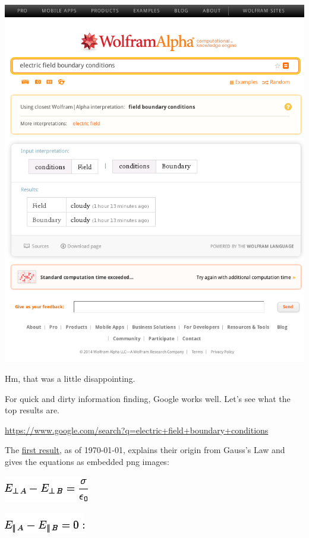 \documentclass[12pt,letterpaper]{article}
\begin{document}
\begin{center}
\includegraphics[scale=0.7]{figures/wolfram-alpha-electric-field-boundary-conditions.png}
\end{center}

Hm, that was a little disappointing.

For quick and dirty information finding,
Google works well.
Let's see what the top results are.

\url{https://www.google.com/search?q=electric+field+boundary+conditions}

The
\href{http://farside.ph.utexas.edu/teaching/em/lectures/node59.html}
{first result}, as of \today,
explains their origin from Gauss's Law
and gives the equations as embedded png images:

\begin{center}
\includegraphics[scale=0.5]{figures/img1337.png}

\includegraphics[scale=0.5]{figures/img1344.png}
\end{center}
\end{document}
